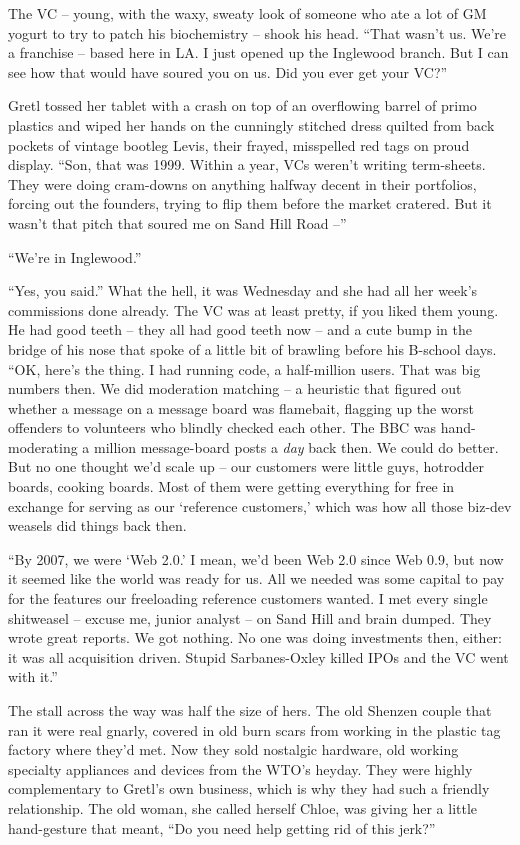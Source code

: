 The VC -- young, with the waxy, sweaty look of someone who ate a lot of 
GM yogurt to try to patch his biochemistry -- shook his head. “That 
wasn't us. We're a franchise -- based here in LA. I just opened up the 
Inglewood branch. But I can see how that would have soured you on us. 
Did you ever get your VC?”

Gretl tossed her tablet with a crash on top of an overflowing barrel of 
primo plastics and wiped her hands on the cunningly stitched dress 
quilted from back pockets of vintage bootleg Levis, their frayed, 
misspelled red tags on proud display. “Son, that was 1999. Within a 
year, VCs weren't writing term-sheets. They were doing cram-downs on 
anything halfway decent in their portfolios, forcing out the founders, 
trying to flip them before the market cratered. But it wasn't that 
pitch that soured me on Sand Hill Road --”

“We're in Inglewood.”

“Yes, you said.” What the hell, it was Wednesday and she had all 
her week's commissions done already. The VC was at least pretty, if you 
liked them young. He had good teeth -- they all had good teeth now -- 
and a cute bump in the bridge of his nose that spoke of a little bit of 
brawling before his B-school days. “OK, here's the thing. I had 
running code, a half-million users. That was big numbers then. We did 
moderation matching -- a heuristic that figured out whether a message 
on a message board was flamebait, flagging up the worst offenders to 
volunteers who blindly checked each other. The BBC was hand-moderating 
a million message-board posts a \emph{day} back then. We could do 
better. But no one thought we'd scale up -- our customers were little 
guys, hotrodder boards, cooking boards. Most of them were getting 
everything for free in exchange for serving as our `reference 
customers,' which was how all those biz-dev weasels did things back 
then.

“By 2007, we were `Web 2.0.' I mean, we'd been Web 2.0 since Web 0.9, 
but now it seemed like the world was ready for us. All we needed was 
some capital to pay for the features our freeloading reference 
customers wanted. I met every single shitweasel -- excuse me, junior 
analyst -- on Sand Hill and brain dumped. They wrote great reports. We 
got nothing. No one was doing investments then, either: it was all 
acquisition driven. Stupid Sarbanes-Oxley killed IPOs and the VC went 
with it.”

The stall across the way was half the size of hers. The old Shenzen 
couple that ran it were real gnarly, covered in old burn scars from 
working in the plastic tag factory where they'd met. Now they sold 
nostalgic hardware, old working specialty appliances and devices from 
the WTO's heyday. They were highly complementary to Gretl's own 
business, which is why they had such a friendly relationship. The old 
woman, she called herself Chloe, was giving her a little hand-gesture 
that meant, “Do you need help getting rid of this jerk?”

